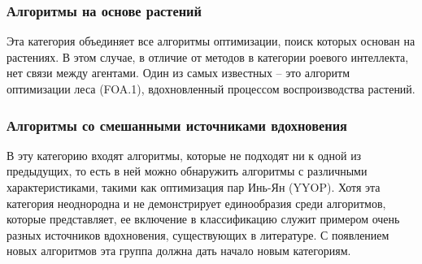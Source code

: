     \subsubsection{Алгоритмы на основе растений}
    
    Эта категория объединяет все алгоритмы оптимизации, поиск которых 
    основан на растениях. В этом случае, в отличие от методов в категории 
    роевого интеллекта, нет связи между агентами. Один из самых известных -- это 
    алгоритм оптимизации леса (FOA.1), вдохновленный процессом 
    воспроизводства растений.

    \subsubsection{Алгоритмы со смешанными источниками вдохновения}
    
    В эту категорию входят алгоритмы, которые не подходят ни к одной из 
    предыдущих, то есть в ней можно обнаружить алгоритмы с различными 
    характеристиками, такими как оптимизация пар Инь-Ян (YYOP). 
    Хотя эта категория неоднородна и не демонстрирует 
    единообразия среди алгоритмов, которые представляет, ее включение 
    в классификацию служит примером очень разных источников вдохновения, 
    существующих в литературе. С появлением новых алгоритмов эта группа 
    должна дать начало новым категориям.

